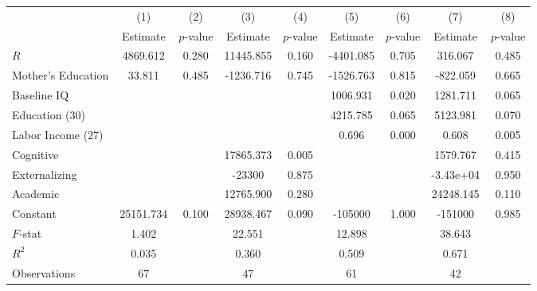 \begin{tabular}{lcccccccc} \toprule
 & (1) & (2) & (3) & (4) & (5) & (6) & (7) & (8) \\ 
 & Estimate  & $p$-value  & Estimate  & $p$-value  & Estimate  & $p$-value  & Estimate  & $p$-value  \\  \midrule
$R$ &  4869.612 &     0.280 & 11445.855 &     0.160 & -4401.085 &     0.705 &   316.067 &     0.485 \\  
Mother's Education &    33.811 &     0.485 & -1236.716 &     0.745 & -1526.763 &     0.815 &  -822.059 &     0.665 \\  
Baseline IQ &         &         &         &         &  1006.931 &     0.020 &  1281.711 &     0.065 \\  
Education (30) &         &         &         &         &  4215.785 &     0.065 &  5123.981 &     0.070 \\  
Labor Income (27) &         &         &         &         &     0.696 &     0.000 &     0.608 &     0.005 \\  
Cognitive &         &         & 17865.373 &     0.005 &         &         &  1579.767 &     0.415 \\  
Externalizing &         &         & -23300 &     0.875 &         &         & -3.43e+04 &     0.950 \\  
Academic &         &         & 12765.900 &     0.280 &         &         & 24248.145 &     0.110 \\  
Constant & 25151.734 &     0.100 & 28938.467 &     0.090 & -105000 &     1.000 & -151000 &     0.985 \\  \midrule
$F$-stat &     1.402 &         &    22.551 &         &    12.898 &         &    38.643 &         \\  
$R^2$ &     0.035 &         &     0.360 &         &     0.509 &         &     0.671 &         \\  
Observations &    67 &         &    47 &         &    61 &         &    42 &         \\  
\bottomrule
\end{tabular}

